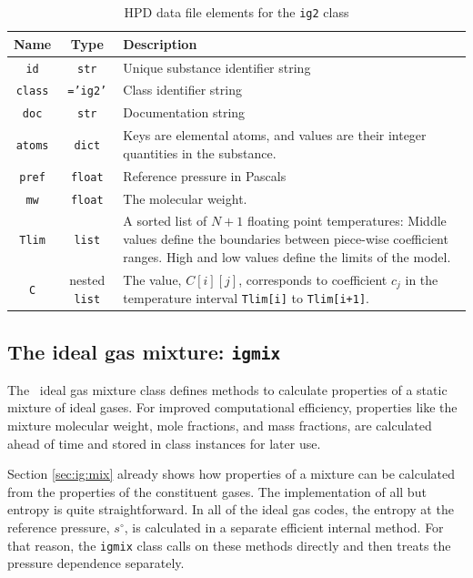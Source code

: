 \begin{table}
\centering
\caption{HPD data file elements for the \texttt{ig2} class}\label{tab:class:ig2}
\begin{tabular}{|ccp{2.5in}|}
\hline
Name & Type & Description\\
\hline
\texttt{id} & \texttt{str} & Unique substance identifier string\\
\texttt{class} & \texttt{='ig2'} & Class identifier string\\
\texttt{doc} & \texttt{str} & Documentation string\\
\hline
\texttt{atoms} & \texttt{dict} & Keys are elemental atoms, and values are their integer quantities in the substance.\\
\texttt{pref} & \texttt{float} & Reference pressure in Pascals\\
\texttt{mw} & \texttt{float} & The molecular weight.\\
\texttt{Tlim} & \texttt{list} & A sorted list of $N+1$ floating point temperatures: Middle values define the boundaries between piece-wise coefficient ranges.  High and low values define the limits of the model.\\
\texttt{C} & nested \texttt{list} & The value, $C[i][j]$, corresponds to coefficient $c_j$ in the temperature interval \texttt{Tlim[i]} to \texttt{Tlim[i+1]}.\\
\hline
\end{tabular}
\end{table}

\subsection{The ideal gas mixture: \texttt{igmix}}

The \PM\ ideal gas mixture class defines methods to calculate properties of a static mixture of ideal gases.  For improved computational efficiency, properties like the mixture molecular weight, mole fractions, and mass fractions, are calculated ahead of time and stored in class instances for later use.

Section \ref{sec:ig:mix} already shows how properties of a mixture can be calculated from the properties of the constituent gases.  The implementation of all but entropy is quite straightforward.  In all of the ideal gas codes, the entropy at the reference pressure, $s^\circ$, is calculated in a separate efficient internal method.  For that reason, the \texttt{igmix} class calls on these methods directly and then treats the pressure dependence separately.

